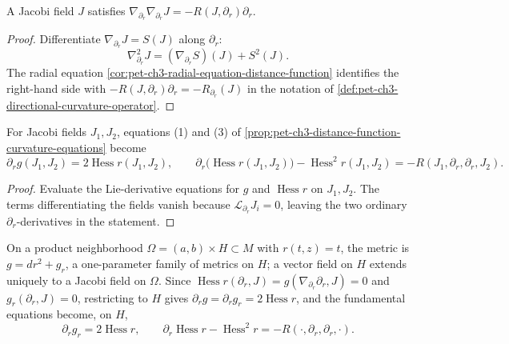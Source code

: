 \begin{proposition}
  \label{prop:pet-ch3-jacobi-second-order-equation}
  \leanok
  A Jacobi field $J$ satisfies $\nabla_{\partial_r}\nabla_{\partial_r}J=-R(J,\partial_r)\partial_r$.
\end{proposition}
\begin{proof}
  \leanok
  \sketch
  Differentiate $\nabla_{\partial_r}J=S(J)$ along $\partial_r$:
  \[
   \nabla_{\partial_r}^2J=(\nabla_{\partial_r}S)(J)+S^2(J).
  \]
  The radial equation \cref{cor:pet-ch3-radial-equation-distance-function}
  identifies the right-hand side with
  $-R(J,\partial_r)\partial_r=-R_{\partial_r}(J)$ in the notation of
  \cref{def:pet-ch3-directional-curvature-operator}.
\end{proof}

\begin{proposition}
  \label{prop:pet-ch3-jacobi-field-curvature-equations}
  \leanok
  For Jacobi fields $J_1,J_2$, equations (1) and (3) of
  \cref{prop:pet-ch3-distance-function-curvature-equations} become
  \[
    \partial_rg(J_1,J_2)=2\operatorname{Hess}r(J_1,J_2),\qquad
    \partial_r\big(\operatorname{Hess}r(J_1,J_2)\big)-\operatorname{Hess}^2r(J_1,J_2)=-R(J_1,\partial_r,\partial_r,J_2).
  \]
\end{proposition}
\begin{proof}
  \leanok
  \sketch
  Evaluate the Lie-derivative equations for $g$ and $\operatorname{Hess}r$ on
  $J_1,J_2$. The terms differentiating the fields vanish
  because $\mathcal L_{\partial_r}J_i=0$, leaving the two ordinary
  $\partial_r$-derivatives in the statement.
\end{proof}

\begin{remark}
  \label{rem:pet-ch3-jacobi-field-product-neighborhood}
  \leanok
  \sketch
  On a product neighborhood $\Omega=(a,b)\times H\subset M$ with $r(t,z)=t$, the
  metric is $g=dr^2+g_r$, a one-parameter family of metrics on $H$; a vector
  field on $H$ extends uniquely to a Jacobi field on $\Omega$. Since
  $\operatorname{Hess}r(\partial_r,J)=g(\nabla_{\partial_r}\partial_r,J)=0$ and
  $g_r(\partial_r,J)=0$, restricting to $H$ gives $\partial_rg=\partial_rg_r=2\operatorname{Hess}r$,
  and the fundamental equations become, on $H$,
  \[
    \partial_rg_r=2\operatorname{Hess}r,\qquad
    \partial_r\operatorname{Hess}r-\operatorname{Hess}^2r=-R(\cdot,\partial_r,\partial_r,\cdot).
  \]
\end{remark}

